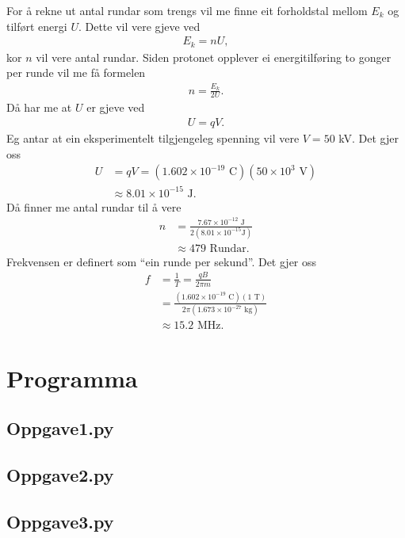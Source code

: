 \documentclass[11pt, a4paper]{article}
\begin{document}
  For å rekne ut antal rundar som trengs vil me finne eit forholdstal mellom $E_k$ og tilført energi $U$. Dette vil vere gjeve ved
  \begin{align*}
    E_k = nU,
  \end{align*}
  kor $n$ vil vere antal rundar. Siden protonet opplever ei energitilføring to gonger per runde vil me få formelen
  \begin{align*}
    n = \frac{E_k}{2U}.
  \end{align*}
  Då har me at $U$ er gjeve ved
  \begin{align*}
    U = qV.
  \end{align*}
  Eg antar at ein eksperimentelt tilgjengeleg spenning vil vere $V = 50$ kV. Det gjer oss
  \begin{align*}
    U &= qV = (1.602\times10^{-19} \text{ C})(50\times10^3\text{ V}) \\
    &\approx 8.01\times10^{-15}\text{ J}.
  \end{align*}
  Då finner me antal rundar til å vere
  \begin{align*}
    n &= \frac{7.67\times10^{-12}\text{ J}}{2(8.01\times10^{-15}\text {J})} \\
    &\approx 479 \text{ Rundar}.
  \end{align*}
  Frekvensen er definert som ``ein runde per sekund''. Det gjer oss
  \begin{align*}
    f &= \frac{1}{T} = \frac{qB}{2\pi m} \\
    &= \frac{(1.602\times10^{-19}\text{ C})(1 \text{ T})}{2\pi (1.673\times10^{-27}\text{ kg})} \\
    &\approx 15.2\text{ MHz}.
  \end{align*}








\newpage

\section{Programma}
  \subsection{Oppgave1.py}
    
  \subsection{Oppgave2.py}
    
  \subsection{Oppgave3.py}
    
\end{document}
